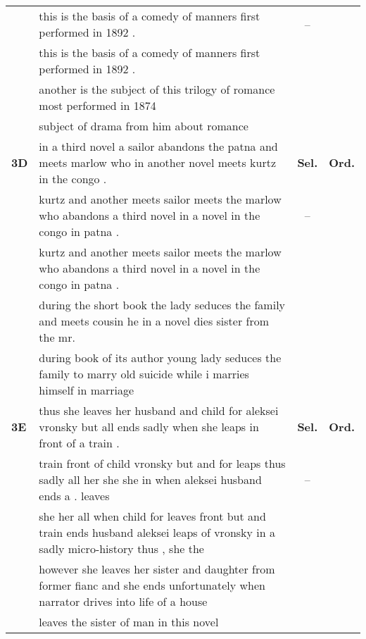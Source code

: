\documentclass[class=article]{standalone}
\newcommand{\cmark}{\ding{51}}%
\newcommand{\xmark}{\ding{55}}%
\newcommand{\namark}{\ding{54}}
\newcommand{\passmark}{--}
\begin{document}
\begin{table*}
\begin{tabular}{ p{\collenone} p{\collentwo} C{\collenthree} C{\collenthree} }
			\textbf{\oracletitle}  & this is the basis of a comedy of manners first performed in 1892 . & \passmark & \cmark \\
			\textbf{\twosteptitle}  & this is the basis of a comedy of manners first performed in 1892 . & \cmark & \cmark \\
			\textbf{\iref}  & another is the subject of this trilogy of romance most performed in 1874 &  &  \\
			\textbf{\ip}  & subject of drama from him about romance  &  &  \\
			\hline
			\textbf{3D \hfill {}}  & in a third novel a sailor abandons the patna and meets marlow who in another novel meets kurtz in the congo . & \textbf{Sel.} & \textbf{Ord.} \\
			\textbf{\oracletitle}  & kurtz and another meets sailor meets the marlow who abandons a third novel in a novel in the congo in patna . & \passmark & \xmark \\
			\textbf{\twosteptitle}  & kurtz and another meets sailor meets the marlow who abandons a third novel in a novel in the congo in patna . & \cmark & \xmark \\
			\textbf{\iref}  & during the short book the lady seduces the family and meets cousin he in a novel dies sister from the mr. &  &  \\
			\textbf{\ip}  & during book of its author young lady seduces the family to marry old suicide while i marries himself in marriage &  &  \\
			\hline
			\textbf{3E \hfill {}}  & thus she leaves her husband and child for aleksei vronsky but all ends sadly when she leaps in front of a train . & \textbf{Sel.} & \textbf{Ord.} \\
			\textbf{\oracletitle}  & train front of child vronsky but and for leaps thus sadly all her she she in when aleksei husband ends a . leaves & \passmark & \namark \\
			\textbf{\twosteptitle}  & she her all when child for leaves front but and train ends husband aleksei leaps of vronsky in a sadly micro-history thus , she the & \xmark & \namark \\
			\textbf{\iref}  & however she leaves her sister and daughter from former fianc and she ends unfortunately when narrator drives into life of a house &  &  \\
			\textbf{\ip}  & leaves the sister of man in this novel &  &  \\
		\end{tabular}
		

\end{table*}
\end{document}
